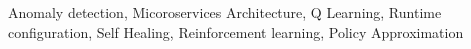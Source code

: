 \documentclass{ieeeaccess}
\begin{document}
\begin{abstract}
\end{abstract}

\begin{keywords}
Anomaly detection, Micoroservices Architecture, Q Learning, Runtime configuration, Self Healing, Reinforcement learning, Policy Approximation 
\end{keywords}

\titlepgskip=-15pt

\maketitle
\end{document}
